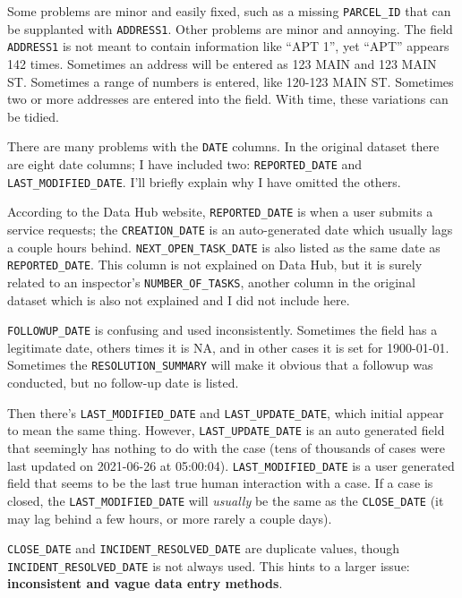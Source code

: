 \documentclass[
]{book}
\begin{document}
Some problems are minor and easily fixed, such as a missing \texttt{PARCEL\_ID} that can be supplanted with \texttt{ADDRESS1}. Other problems are minor and annoying. The field \texttt{ADDRESS1} is not meant to contain information like ``APT 1'', yet ``APT'' appears 142 times. Sometimes an address will be entered as 123 MAIN and 123 MAIN ST. Sometimes a range of numbers is entered, like 120-123 MAIN ST. Sometimes two or more addresses are entered into the field. With time, these variations can be tidied.

There are many problems with the \texttt{DATE} columns. In the original dataset there are eight date columns; I have included two: \texttt{REPORTED\_DATE} and \texttt{LAST\_MODIFIED\_DATE}. I'll briefly explain why I have omitted the others.

According to the Data Hub website, \texttt{REPORTED\_DATE} is when a user submits a service requests; the \texttt{CREATION\_DATE} is an auto-generated date which usually lags a couple hours behind. \texttt{NEXT\_OPEN\_TASK\_DATE} is also listed as the same date as \texttt{REPORTED\_DATE}. This column is not explained on Data Hub, but it is surely related to an inspector's \texttt{NUMBER\_OF\_TASKS}, another column in the original dataset which is also not explained and I did not include here.

\texttt{FOLLOWUP\_DATE} is confusing and used inconsistently. Sometimes the field has a legitimate date, others times it is NA, and in other cases it is set for 1900-01-01. Sometimes the \texttt{RESOLUTION\_SUMMARY} will make it obvious that a followup was conducted, but no follow-up date is listed.

Then there's \texttt{LAST\_MODIFIED\_DATE} and \texttt{LAST\_UPDATE\_DATE}, which initial appear to mean the same thing. However, \texttt{LAST\_UPDATE\_DATE} is an auto generated field that seemingly has nothing to do with the case (tens of thousands of cases were last updated on 2021-06-26 at 05:00:04). \texttt{LAST\_MODIFIED\_DATE} is a user generated field that seems to be the last true human interaction with a case. If a case is closed, the \texttt{LAST\_MODIFIED\_DATE} will \emph{usually} be the same as the \texttt{CLOSE\_DATE} (it may lag behind a few hours, or more rarely a couple days).

\texttt{CLOSE\_DATE} and \texttt{INCIDENT\_RESOLVED\_DATE} are duplicate values, though \texttt{INCIDENT\_RESOLVED\_DATE} is not always used. This hints to a larger issue: \textbf{inconsistent and vague data entry methods}.
\end{document}
